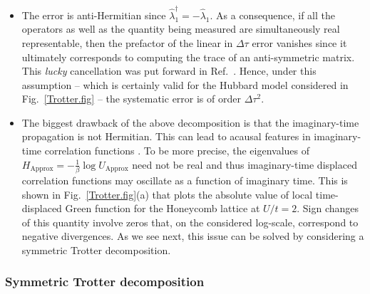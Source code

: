 \begin{itemize}
\item    The error is anti-Hermitian  since $\hat{\lambda}_1^{\dagger} = - \hat{\lambda}_1 $. As a consequence, if all the operators as well as the quantity being measured are simultaneously real representable,  then   the prefactor of the linear in $\Delta  \tau$ error vanishes since it ultimately corresponds to computing the trace of an  anti-symmetric matrix. This \textit{lucky}   cancellation was put forward in  Ref.~\cite{Fye86}.   Hence, under this assumption -- which is certainly valid for the Hubbard model considered in Fig.~\ref{Trotter.fig} -- the systematic error is of order $\Delta \tau^2$.
\item  The biggest drawback  of the above decomposition is that  the imaginary-time propagation is not Hermitian.   This can lead to acausal  features in imaginary-time correlation functions \cite{Beyl_thesis}. To be more precise, the eigenvalues of  
$  H_{\text{Approx}} = - \frac{1}{\beta} \log  U_{\text{Approx}}$ need not be real and thus imaginary-time displaced correlation functions may oscillate as a function of imaginary time.   
This is shown in  Fig.~\ref{Trotter.fig}(a)  that plots the  absolute value of local time-displaced Green function for  the Honeycomb lattice at $U/t=2$.  Sign changes of this quantity   involve zeros  that, on the considered log-scale,  correspond to negative divergences.
As we see next, this issue can be solved by considering a symmetric  Trotter decomposition. 
\end{itemize}


\subsubsection{Symmetric Trotter decomposition} 

